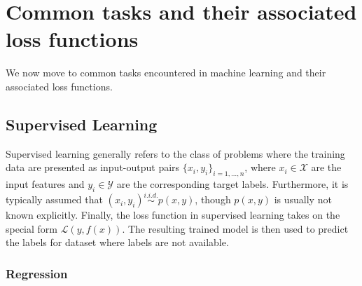 \section{Common tasks and their associated loss functions}\label{ML:sec:tasks_and_loss}

We now move to common tasks encountered in machine learning and their associated loss functions. 

\subsection{Supervised Learning}\label{ML:sec:supervised}

Supervised learning generally refers to the class of problems where the training data are presented as input-output pairs $\{x_i, y_i\}_{i=1,\dots,n}$, where $x_i \in \mathcal{X}$ are the input features and $y_i \in \mathcal{Y}$ are the corresponding target labels. Furthermore, it is typically assumed that $(x_i,y_i) \overset{i.i.d.}{\sim} p(x,y)$, though $p(x,y)$ is usually not known explicitly. Finally, the loss function in supervised learning takes on the special form $\mathcal{L}(y, f(x))$. The resulting trained model is then  used to predict the labels for dataset where labels are not available. 

\subsubsection{Regression}\label{ML:sec:regression}

